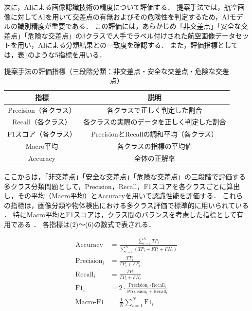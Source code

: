 \documentclass[uplatex,dvipdfmx]{jsarticle}
\begin{document}
\indent
次に，AIによる画像認識技術の精度について評価する．
提案手法では，航空画像に対してAIを用いて交差点の有無およびその危険性を判定するため，AIモデルの識別精度が重要である．
この評価には，あらかじめ「非交差点」「安全な交差点」「危険な交差点」の3クラスで人手でラベル付けされた航空画像データセットを用い，AIによる分類結果との一致度を確認する．
また，評価指標としては，表\ref{tab:evaluation_metrics}のような5指標を用いる．

\begin{table}[H]
  \centering
  \caption{提案手法の評価指標（三段階分類：非交差点・安全な交差点・危険な交差点）}
  \label{tab:evaluation_metrics}
  \begin{tabular}{|c|c|}
    \hline
    指標 & 説明 \\ \hline
    Precision（各クラス） & 各クラスで正しく判定した割合 \\ \hline
    Recall（各クラス） & 各クラスの実際のデータを正しく判定した割合 \\ \hline
    F1スコア（各クラス） & PrecisionとRecallの調和平均（各クラス） \\ \hline
    Macro平均 & 各クラスの指標の平均値 \\ \hline
    Accuracy & 全体の正解率 \\ \hline
  \end{tabular}
\end{table}

ここからは，「非交差点」「安全な交差点」「危険な交差点」の三段階で評価する多クラス分類問題として，Precision，Recall，F1スコアを各クラスごとに算出し，その平均（Macro平均）とAccuracyを用いて認識性能を評価する．
これらの指標は，画像分類や物体検出における多クラス評価で標準的に用いられている \cite{powers2011evaluation, padilla2021comparative}．
特にMacro平均とF1スコアは，クラス間のバランスを考慮した指標として有用である \cite{saito2015precision}．
各指標は(2)〜(6)の数式で表される．

\begin{align}
\mathrm{Accuracy} &= \frac{\sum_{i=1}^{N} TP_i}{\sum_{i=1}^{N} (TP_i + FP_i + FN_i)} \\
\mathrm{Precision}_i &= \frac{TP_i}{TP_i + FP_i} \\
\mathrm{Recall}_i &= \frac{TP_i}{TP_i + FN_i} \\
\mathrm{F1}_i &= 2 \cdot \frac{\mathrm{Precision}_i \cdot \mathrm{Recall}_i}{\mathrm{Precision}_i + \mathrm{Recall}_i} \\
\mathrm{Macro\text{-}F1} &= \frac{1}{N} \sum_{i=1}^{N} \mathrm{F1}_i
\end{align}
\end{document}

